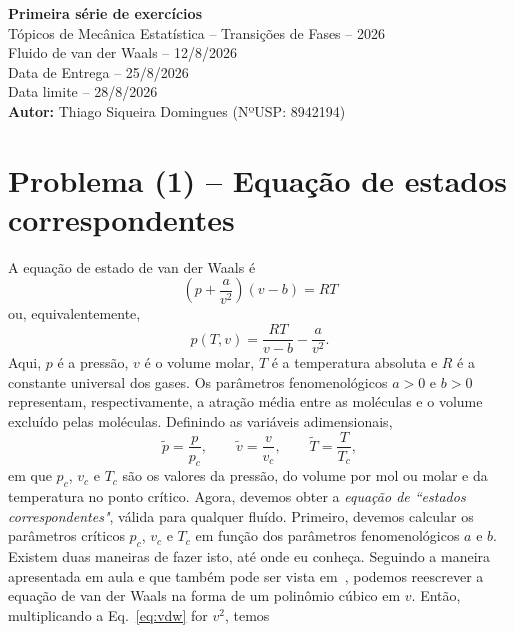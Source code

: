 \documentclass[11pt,a4paper]{article}
\begin{document}
%
\begin{center} 
    {\Large \textbf{Primeira série de exercícios}}\\[0.6cm]
    {\large Tópicos de Mecânica Estatística -- Transições de Fases -- 2026}\\[0.2cm]
    {\large Fluido de van der Waals -- 12/8/2026}\\[0.4cm]    
    {\large Data de Entrega -- 25/8/2026}\\[0.2cm]
    {\large Data limite -- 28/8/2026}\\[0.4cm]
    {\Large \textbf{Autor:} Thiago Siqueira Domingues (NºUSP: 8942194)}    
\end{center}
%
\vspace{0.5cm}
\section*{Problema (1) -- Equação de estados correspondentes}
%
A equação de estado de van der Waals é
%
\begin{equation}
    \left(p+\frac{a}{v^2}\right)(v-b)=RT
\label{eq:vdw}
\end{equation}
%
ou, equivalentemente,
%
\begin{equation}
    p(T,v)=\frac{RT}{v-b}-\frac{a}{v^2}.
\label{eq:pvdw}
\end{equation}
%
Aqui, $p$ é a pressão, $v$ é o volume molar, $T$ é a temperatura absoluta e $R$ é a constante universal dos gases. Os parâmetros fenomenológicos $a>0$ e $b>0$ representam, respectivamente, a atração média entre as moléculas e o volume excluído pelas moléculas.
%
Definindo as variáveis adimensionais, 
%
\begin{equation}
    \tilde p=\frac{p}{p_c},
    \qquad
    \tilde v=\frac{v}{v_c},
    \qquad
    \tilde T=\frac{T}{T_c},
\label{eq:reduced_variables}
\end{equation}
%
em que $p_c$, $v_c$ e $T_c$ são os valores da pressão, do volume por mol ou molar e da temperatura no ponto crítico. 
%
Agora, devemos obter a \textit{equação de ``estados correspondentes"}, válida para qualquer fluído. Primeiro, devemos calcular os parâmetros críticos $p_c$, $v_c$ e $T_c$ em função dos parâmetros fenomenológicos $a$ e $b$. Existem duas maneiras de fazer isto, até onde eu conheça. Seguindo a maneira apresentada em aula e que também pode ser vista em~\cite{salinas}, podemos reescrever a equação de van der Waals na forma de um polinômio cúbico em $v$. 
%
Então, multiplicando a Eq.~\ref{eq:vdw} for $v^2$, temos  
\end{document}
